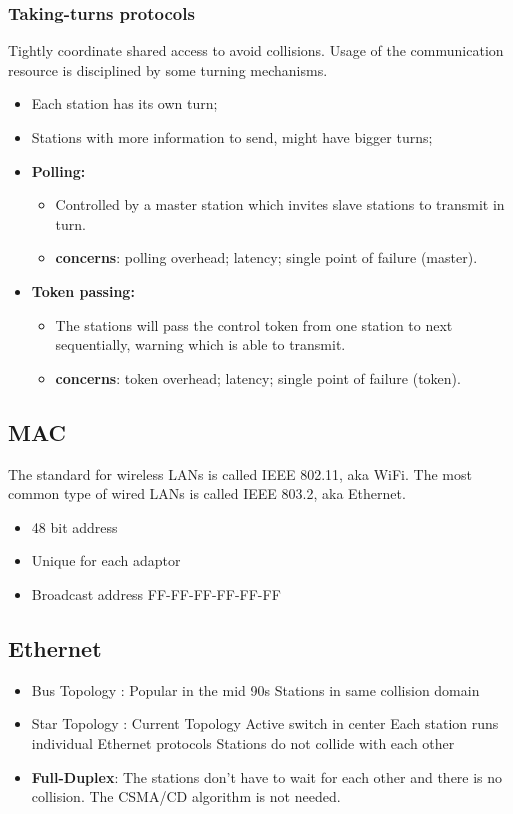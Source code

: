 \documentclass[../resumosRCOM.tex]{subfiles}
\begin{document}
\subsubsection{Taking-turns protocols}
Tightly coordinate shared access to avoid collisions.
\newline
Usage of the communication resource is disciplined by some turning mechanisms.
\begin{itemize}
    \item Each station has its own turn;
    \item Stations with more information to send, might have bigger turns;
    \item \textbf{Polling:}
    \begin{itemize}
        \item Controlled by a master station which invites slave stations to transmit in turn.
        \item \textbf{concerns}: polling overhead; latency; single point of failure (master).
    \end{itemize}
    \item \textbf{Token passing:}
    \begin{itemize}
        \item The stations will pass the control token from one station to next sequentially, warning which is able to transmit.
        \item \textbf{concerns}: token overhead; latency; single point of failure (token).
    \end{itemize}
\end{itemize}
\subsection{MAC}

The standard for wireless LANs is called IEEE 802.11, aka WiFi.
\newline
The most common type of wired LANs is called IEEE 803.2, aka Ethernet.
\begin{itemize}
    \item 48 bit address
    \item Unique for each adaptor
    \item Broadcast address FF-FF-FF-FF-FF-FF
\end{itemize}
\subsection{Ethernet}
\begin{itemize}
    \item Bus Topology :
    \subitem Popular in the mid 90s
    \subitem Stations in same collision domain
    \item Star Topology :
    \subitem Current Topology
    \subitem Active switch in center
    \subitem Each station runs individual Ethernet protocols
    \subitem Stations do not collide with each other
    \item \textbf{Full-Duplex}: The stations don't have to wait for each other and there is no collision. The CSMA/CD algorithm is not needed.
\end{itemize}
\end{document}
